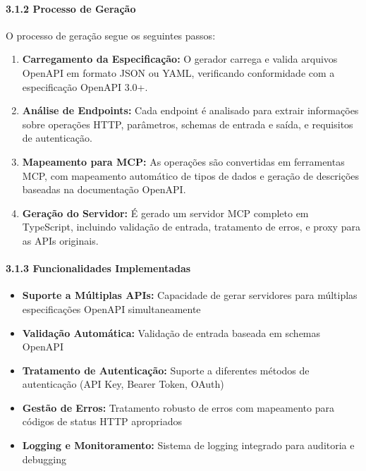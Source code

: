 \documentclass[
]{article}
\providecommand{\tightlist}{%
  \setlength{\itemsep}{0pt}\setlength{\parskip}{0pt}}
\begin{document}
\paragraph{3.1.2 Processo de Geração}\label{processo-de-gerauxe7uxe3o}

O processo de geração segue os seguintes passos:

\begin{enumerate}
\def\labelenumi{\arabic{enumi}.}
\item
  \textbf{Carregamento da Especificação:} O gerador carrega e valida
  arquivos OpenAPI em formato JSON ou YAML, verificando conformidade com
  a especificação OpenAPI 3.0+.
\item
  \textbf{Análise de Endpoints:} Cada endpoint é analisado para extrair
  informações sobre operações HTTP, parâmetros, schemas de entrada e
  saída, e requisitos de autenticação.
\item
  \textbf{Mapeamento para MCP:} As operações são convertidas em
  ferramentas MCP, com mapeamento automático de tipos de dados e geração
  de descrições baseadas na documentação OpenAPI.
\item
  \textbf{Geração do Servidor:} É gerado um servidor MCP completo em
  TypeScript, incluindo validação de entrada, tratamento de erros, e
  proxy para as APIs originais.
\end{enumerate}

\paragraph{3.1.3 Funcionalidades
Implementadas}\label{funcionalidades-implementadas}

\begin{itemize}
\tightlist
\item
  \textbf{Suporte a Múltiplas APIs:} Capacidade de gerar servidores para
  múltiplas especificações OpenAPI simultaneamente
\item
  \textbf{Validação Automática:} Validação de entrada baseada em schemas
  OpenAPI
\item
  \textbf{Tratamento de Autenticação:} Suporte a diferentes métodos de
  autenticação (API Key, Bearer Token, OAuth)
\item
  \textbf{Gestão de Erros:} Tratamento robusto de erros com mapeamento
  para códigos de status HTTP apropriados
\item
  \textbf{Logging e Monitoramento:} Sistema de logging integrado para
  auditoria e debugging
\end{itemize}
\end{document}
